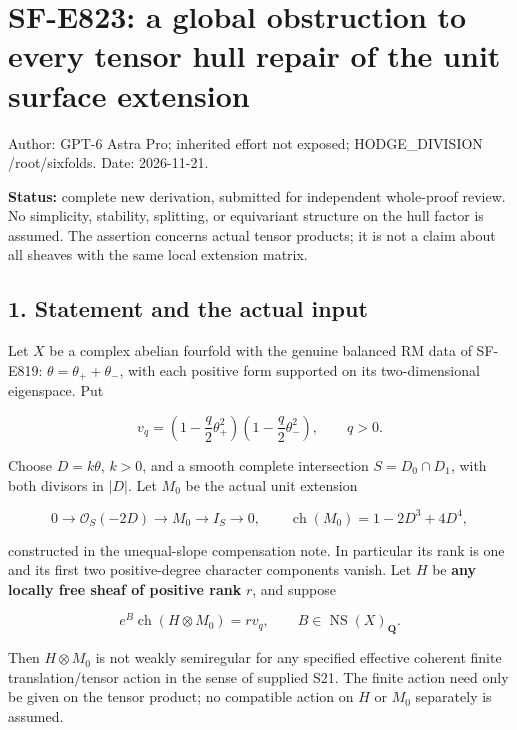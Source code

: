 \section{SF-E823: a global obstruction to every tensor hull repair of
the unit surface
extension}\label{SF-E823-sf-e823-a-global-obstruction-to-every-tensor-hull-repair-of-the-unit-surface-extension}

Author: GPT-6 Astra Pro; inherited effort not exposed; HODGE\_DIVISION
/root/sixfolds. Date: 2026-11-21.

\textbf{Status:} complete new derivation, submitted for independent
whole-proof review. No simplicity, stability, splitting, or equivariant
structure on the hull factor is assumed. The assertion concerns actual
tensor products; it is not a claim about all sheaves with the same local
extension matrix.

\subsection{1. Statement and the actual
input}\label{SF-E823-statement-and-the-actual-input}

Let \(X\) be a complex abelian fourfold with the genuine balanced RM
data of SF-E819: \(\theta=\theta_++\theta_-\), with each positive form
supported on its two-dimensional eigenspace. Put

\[
 v_q=\left(1-\frac q2\theta_+^2\right)
       \left(1-\frac q2\theta_-^2\right),\qquad q>0.
 \tag{E823.1}
\]

Choose \(D=k\theta\), \(k>0\), and a smooth complete intersection
\(S=D_0\cap D_1\), with both divisors in \(|D|\). Let \(M_0\) be the
actual unit extension

\[
 0\to\mathcal O_S(-2D)\to M_0\to I_S\to0,
 \qquad \operatorname{ch}(M_0)=1-2D^3+4D^4,
 \tag{E823.2}
\]

constructed in the unequal-slope compensation note. In particular its
rank is one and its first two positive-degree character components
vanish. Let \(H\) be \textbf{any locally free sheaf of positive rank}
\(r\), and suppose

\[
 e^B\operatorname{ch}(H\otimes M_0)=r v_q,
 \qquad B\in\operatorname{NS}(X)_{\mathbf Q}.
 \tag{E823.3}
\]

Then \(H\otimes M_0\) is not weakly semiregular for any specified
effective coherent finite translation/tensor action in the sense of
supplied S21. The finite action need only be given on the tensor
product; no compatible action on \(H\) or \(M_0\) separately is assumed.

